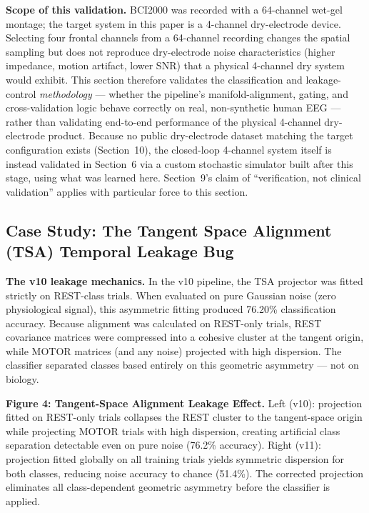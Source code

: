 \documentclass[11pt]{article}
\begin{document}
\textbf{Scope of this validation.} BCI2000 was recorded with a 64-channel wet-gel montage; the target system in this paper is a 4-channel dry-electrode device. Selecting four frontal channels from a 64-channel recording changes the spatial sampling but does not reproduce dry-electrode noise characteristics (higher impedance, motion artifact, lower SNR) that a physical 4-channel dry system would exhibit. This section therefore validates the classification and leakage-control \emph{methodology} --- whether the pipeline's manifold-alignment, gating, and cross-validation logic behave correctly on real, non-synthetic human EEG --- rather than validating end-to-end performance of the physical 4-channel dry-electrode product. Because no public dry-electrode dataset matching the target configuration exists (Section~10), the closed-loop 4-channel system itself is instead validated in Section~6 via a custom stochastic simulator built after this stage, using what was learned here. Section~9's claim of ``verification, not clinical validation'' applies with particular force to this section.

\subsection{Case Study: The Tangent Space Alignment (TSA) Temporal Leakage Bug}

\textbf{The v10 leakage mechanics.} In the v10 pipeline, the TSA projector was fitted strictly on REST-class trials. When evaluated on pure Gaussian noise (zero physiological signal), this asymmetric fitting produced 76.20\% classification accuracy. Because alignment was calculated on REST-only trials, REST covariance matrices were compressed into a cohesive cluster at the tangent origin, while MOTOR matrices (and any noise) projected with high dispersion. The classifier separated classes based entirely on this geometric asymmetry --- not on biology.

\textbf{Figure 4: Tangent-Space Alignment Leakage Effect.} Left (v10): projection fitted on REST-only trials collapses the REST cluster to the tangent-space origin while projecting MOTOR trials with high dispersion, creating artificial class separation detectable even on pure noise (76.2\% accuracy). Right (v11): projection fitted globally on all training trials yields symmetric dispersion for both classes, reducing noise accuracy to chance (51.4\%). The corrected projection eliminates all class-dependent geometric asymmetry before the classifier is applied.
\end{document}
